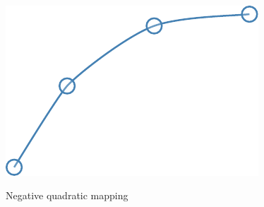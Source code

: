 \begin{figure}[H]
		\\[0.5em]
		\includegraphics[]{images/results/terrains/512-1/blending/neg_quadratic_spline.pdf}
		\caption{Negative quadratic mapping}
		\label{fig:ex-negquadratic-surface}
	\end{figure}
	
